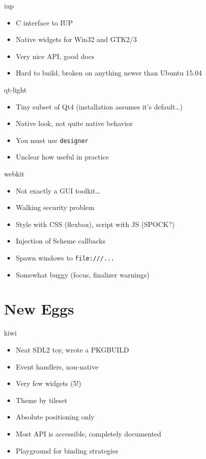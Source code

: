 \documentclass[presentation]{beamer}
\begin{document}
\begin{frame}[label=sec-3-3]{iup}
\begin{itemize}
\item C interface to IUP
\item Native widgets for Win32 and GTK2/3
\item Very nice API, good docs
\item Hard to build, broken on anything newer than Ubuntu 15.04
\end{itemize}
\end{frame}

\begin{frame}[fragile,label=sec-3-4]{qt-light}
 \begin{itemize}
\item Tiny subset of Qt4 (installation assumes it's default\ldots{})
\item Native look, not quite native behavior
\item You \alert{must} use \texttt{designer}
\item Unclear how useful in practice
\end{itemize}
\end{frame}

\begin{frame}[fragile,label=sec-3-5]{webkit}
 \begin{itemize}
\item Not exactly a GUI toolkit\ldots{}
\item Walking security problem
\item Style with CSS (flexbox), script with JS (SPOCK?)
\item Injection of Scheme callbacks
\item Spawn windows to \texttt{file:///...}
\item Somewhat buggy (focus, finalizer warnings)
\end{itemize}
\end{frame}

\section{New Eggs}
\label{sec-4}

\begin{frame}[label=sec-4-1]{kiwi}
\begin{itemize}
\item Neat SDL2 toy, wrote a PKGBUILD
\item Event handlers, non-native
\item Very few widgets (5!)
\item Theme by tileset
\item Absolute positioning only
\item Most API is accessible, completely documented
\item Playground for binding strategies
\end{itemize}
\end{frame}
\end{document}
